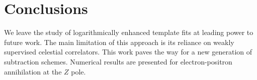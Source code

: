 \section{Conclusions}\label{sec:conclusions}

We leave the study of logarithmically enhanced template fits at leading
power to future work. The main limitation of this approach is its
reliance on weakly supervised celestial correlators. This work paves the
way for a new generation of subtraction schemes. Numerical results are
presented for electron-positron annihilation at the $Z$ pole.

